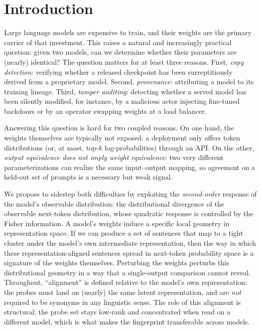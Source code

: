 \documentclass[11pt]{article}
\theoremstyle{definition}
\begin{document}
\section{Introduction}
\label{sec:intro}

Large language models are expensive to train, and their weights are the primary
carrier of that investment. This raises a natural and increasingly practical
question: given two models, can we determine whether their parameters are
(nearly) identical? The question matters for at least three reasons. First,
\emph{copy detection}: verifying whether a released checkpoint has been
surreptitiously derived from a proprietary model. Second,
\emph{provenance}: attributing a model to its training lineage. Third,
\emph{tamper auditing}: detecting whether a served model has been silently
modified, for instance, by a malicious actor injecting fine-tuned backdoors or
by an operator swapping weights at a load balancer.

Answering this question is hard for two coupled reasons. On one hand, the
weights themselves are typically not exposed: a deployment only offers token
distributions (or, at most, top-$k$ log-probabilities) through an API. On the
other, \emph{output equivalence does not imply weight equivalence}: two very
different parameterizations can realize the same input--output mapping, so
agreement on a held-out set of prompts is a necessary but weak signal.

We propose to sidestep both difficulties by exploiting the
\emph{second-order} response of the model's observable distribution: the
distributional divergence of the observable next-token distribution, whose
quadratic response is controlled by the Fisher information. A model's weights
induce a specific local geometry in representation space. If we can produce a
set of sentences that map to a tight cluster under the model's own
intermediate representation, then the way in which these
representation-aligned sentences spread in next-token probability space is a
signature of the weights themselves. Perturbing the weights perturbs this
distributional geometry in a way that a single-output comparison cannot reveal.
Throughout, ``alignment'' is defined relative to the model's own
representation: the probes must land on (nearly) the same latent
representation, and are \emph{not} required to be synonyms in any linguistic
sense. The role of this alignment is structural: the probe set stays low-rank
and concentrated when read on a different model, which is what makes the
fingerprint transferable across models.
\end{document}
